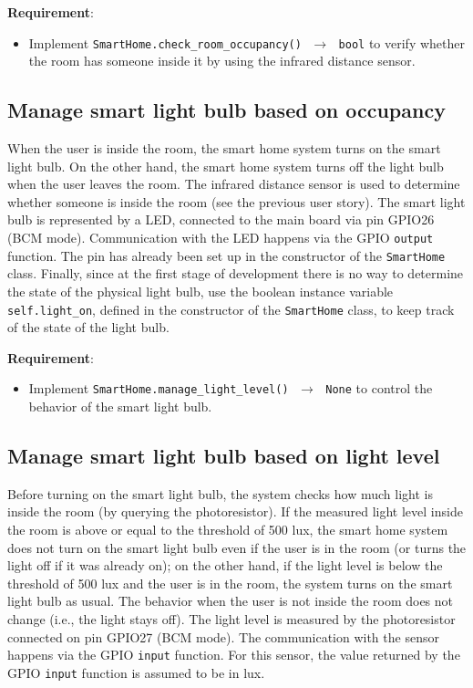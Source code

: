 \noindent\textbf{Requirement}:
\begin{itemize}
    \item Implement \texttt{SmartHome.check\_room\_occupancy() $\,\to\,$ bool} to verify whether the room has someone inside it by using the infrared distance sensor.
\end{itemize}


\subsection{Manage smart light bulb based on occupancy}
When the user is inside the room, the smart home system turns on the smart light bulb. On the other hand, the smart home system turns off the light bulb when the user leaves the room. The infrared distance sensor is used to determine whether someone is inside the room (see the previous user story).
The smart light bulb is represented by a LED, connected to the main board via pin GPIO26 (BCM mode). Communication with the LED happens via the GPIO \texttt{output} function. The pin has already been set up in the constructor of  the \texttt{SmartHome} class.
Finally, since at the first stage of development there is no way to determine the state of the physical light bulb, use the boolean instance variable \texttt{self.light\_on}, defined in the constructor of the \texttt{SmartHome} class, to keep track of the state of the light bulb.

\noindent\textbf{Requirement}:
\begin{itemize}
    \item Implement \texttt{SmartHome.manage\_light\_level() $\,\to\,$ None} to control the behavior of the smart light bulb.
\end{itemize}


\subsection{Manage smart light bulb based on light level}
Before turning on the smart light bulb, the system checks how much light is inside the room (by querying the photoresistor). 
If the measured light level inside the room is above or equal to the threshold of 500 lux, the smart home system does not turn on the smart light bulb even if the user is in the room (or turns the light off if it was already on); on the other hand, if the light level is below the threshold of 500 lux and the user is in the room, the system turns on the smart light bulb as usual.
The behavior when the user is not inside the room does not change (i.e., the light stays off).
The light level is measured by the photoresistor connected on pin GPIO27 (BCM mode). The communication with the sensor happens via the GPIO \texttt{input} function. For this sensor, the value returned by the GPIO \texttt{input} function is assumed to be in lux.

